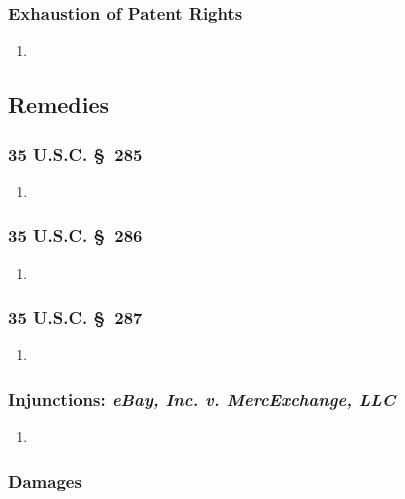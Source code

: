 \subsubsection{Exhaustion of Patent Rights} %

\begin{enumerate}
    \item 
\end{enumerate}


\subsection{Remedies}

\subsubsection{35 U.S.C. \S\ 285} %

\begin{enumerate}
    \item 
\end{enumerate}

\subsubsection{35 U.S.C. \S\ 286} %

\begin{enumerate}
    \item 
\end{enumerate}

\subsubsection{35 U.S.C. \S\ 287} %

\begin{enumerate}
    \item 
\end{enumerate}

\subsubsection{Injunctions: \emph{eBay, Inc. v. MercExchange, LLC}} %

\begin{enumerate}
    \item 
\end{enumerate}

\subsubsection{Damages}

